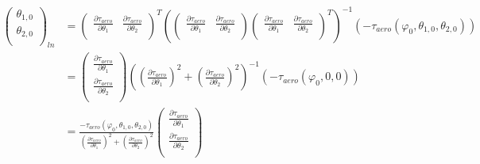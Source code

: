 \documentclass[12pt]{article}
\begin{document}
\begin{align*}
\begin{pmatrix}
\theta_{1, 0} \\
\theta_{2, 0} \\
\end{pmatrix}_{ln} &= \begin{pmatrix}
\frac{\partial \tau_{aero}}{\partial \theta_1} & \frac{\partial \tau_{aero}}{\partial \theta_2} \\
\end{pmatrix}^T
\left(\begin{pmatrix}
\frac{\partial \tau_{aero}}{\partial \theta_1} & \frac{\partial \tau_{aero}}{\partial \theta_2} \\
\end{pmatrix}
\begin{pmatrix}
\frac{\partial \tau_{aero}}{\partial \theta_1} & \frac{\partial \tau_{aero}}{\partial \theta_2} \\
\end{pmatrix}^T\right)^{-1}
 (-\tau_{aero}(\varphi_0, \theta_{1, 0}, \theta_{2, 0}))\\
&= \begin{pmatrix}
\frac{\partial \tau_{aero}}{\partial \theta_1} \\
\frac{\partial \tau_{aero}}{\partial \theta_2} \\
\end{pmatrix}
\left(\left(\frac{\partial \tau_{aero}}{\partial \theta_1}\right)^2 + \left(\frac{\partial \tau_{aero}}{\partial \theta_2}\right)^2\right)^{-1}  (-\tau_{aero}(\varphi_0, 0, 0)) \\
&= \frac{-\tau_{aero}(\varphi_0, \theta_{1, 0}, \theta_{2, 0})}{\left(\frac{\partial \tau_{aero}}{\partial \theta_1}\right)^2 + \left(\frac{\partial \tau_{aero}}{\partial \theta_2}\right)^2}
\begin{pmatrix}
\frac{\partial \tau_{aero}}{\partial \theta_1} \\
\frac{\partial \tau_{aero}}{\partial \theta_2} \\
\end{pmatrix} \\
\end{align*}
\end{document}
